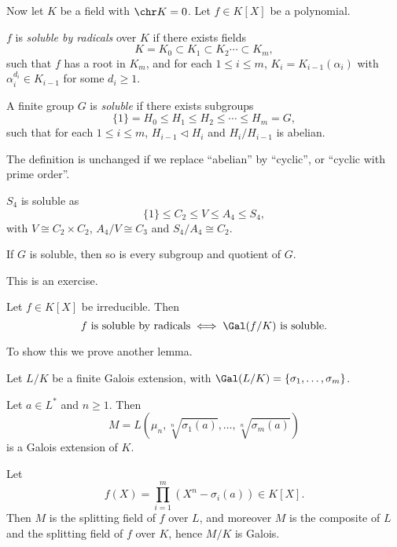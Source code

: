 \documentclass[12pt]{article}
\begin{document}
Now let $K$ be a field with $\chr K = 0$. Let $f \in K[X]$ be a polynomial.

\begin{definition}
	$f$ is \emph{soluble by radicals} over $K$ if there exists fields
	\[
	K = K_0 \subset K_1 \subset K_2 \cdots \subset K_m,
	\]
	such that $f$ has a root in $K_m$, and for each $1 \leq i \leq m$, $K_i = K_{i-1}(\alpha_i)$ with $\alpha_i^{d_i} \in K_{i-1}$ for some $d_i \geq 1$.
\end{definition}

\begin{definition}
	A finite group $G$ is \emph{soluble} if there exists subgroups
	\[
		\{1\} = H_0 \leq H_1 \leq H_2 \leq \cdots \leq H_m = G,
	\]
	such that for each $1 \leq i \leq m$, $H_{i-1} \lhd H_i$ and $H_i/H_{i-1}$ is abelian.
\end{definition}

\begin{remark}
	The definition is unchanged if we replace ``abelian'' by ``cyclic'', or ``cyclic with prime order''.
\end{remark}

\begin{exbox}
	$S_4$ is soluble as
	\[
		\{1\} \leq C_2 \leq V \leq A_4 \leq S_4,
	\]
	with $V \cong C_2 \times C_2$, $A_4/V \cong C_3$ and $S_4/A_4 \cong C_2$.
\end{exbox}

\begin{lemma}
	If $G$ is soluble, then so is every subgroup and quotient of $G$.
\end{lemma}

This is an exercise.

\begin{theorem}
	Let $f \in K[X]$ be irreducible. Then
	\[
		f \text{ is soluble by radicals} \iff \Gal(f/K) \text{ is soluble}.
	\]
\end{theorem}
To show this we prove another lemma.

\begin{lemma}
	Let $L/K$ be a finite Galois extension, with $\Gal(L/K) = \{\sigma_1, \ldots, \sigma_m\}$.

	Let $a \in L^{\ast}$ and $n \geq 1$. Then
	\[
		M = L(\mu_n, \sqrt[n]{\sigma_1(a)}, \ldots, \sqrt[n]{\sigma_m(a)})
	\]
	is a Galois extension of $K$.
\end{lemma}

\begin{proofbox}
	Let
	\[
		f(X) = \prod_{i = 1}^{m}(X^n - \sigma_i(a)) \in K[X].
	\]
	Then $M$ is the splitting field of $f$ over $L$, and moreover $M$ is the composite of $L$ and the splitting field of $f$ over $K$, hence $M/K$ is Galois.
\end{proofbox}
\end{document}
